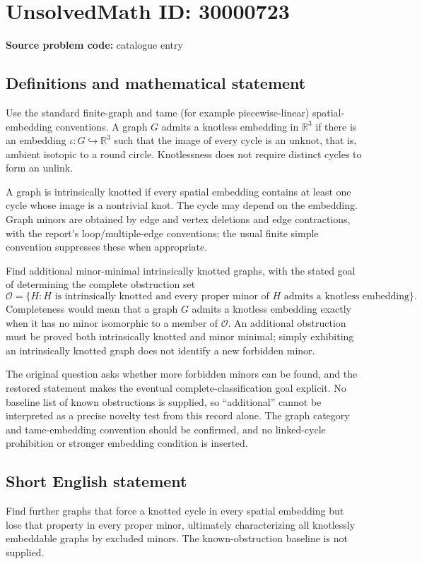\documentclass[11pt]{article}
\newcommand{\R}{\mathbb{R}}
\begin{document}
\section*{UnsolvedMath ID: 30000723}
\textbf{Source problem code:} catalogue entry
\subsection{Definitions and mathematical statement}
Use the standard finite-graph and tame (for example piecewise-linear) spatial-embedding conventions. A graph $G$ admits a knotless embedding in $\R^3$ if there is an embedding $\iota:G\hookrightarrow\R^3$ such that the image of every cycle is an unknot, that is, ambient isotopic to a round circle. Knotlessness does not require distinct cycles to form an unlink.

A graph is intrinsically knotted if every spatial embedding contains at least one cycle whose image is a nontrivial knot. The cycle may depend on the embedding. Graph minors are obtained by edge and vertex deletions and edge contractions, with the report's loop/multiple-edge conventions; the usual finite simple convention suppresses these when appropriate.

Find additional minor-minimal intrinsically knotted graphs, with the stated goal of determining the complete obstruction set
\[
 \mathcal O=\{H:H\text{ is intrinsically knotted and every proper minor of }H
                                  \text{ admits a knotless embedding}\}.
\]
Completeness would mean that a graph $G$ admits a knotless embedding exactly when it has no minor isomorphic to a member of $\mathcal O$. An additional obstruction must be proved both intrinsically knotted and minor minimal; simply exhibiting an intrinsically knotted graph does not identify a new forbidden minor.

The original question asks whether more forbidden minors can be found, and the restored statement makes the eventual complete-classification goal explicit. No baseline list of known obstructions is supplied, so ``additional'' cannot be interpreted as a precise novelty test from this record alone. The graph category and tame-embedding convention should be confirmed, and no linked-cycle prohibition or stronger embedding condition is inserted.
\subsection{Short English statement}
Find further graphs that force a knotted cycle in every spatial embedding but lose that property in every proper minor, ultimately characterizing all knotlessly embeddable graphs by excluded minors. The known-obstruction baseline is not supplied.
\end{document}
